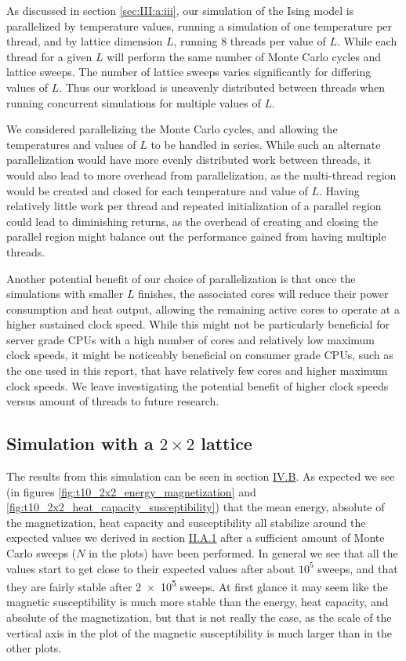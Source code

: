 \documentclass[reprint,english,notitlepage]{revtex4-1}  %
\begin{document}
As discussed in section \ref{sec:III:a:iii}, our simulation of the Ising model is parallelized by temperature values, running a simulation of one temperature per thread, and by lattice dimension \(L\), running \(8\) threads per value of \(L\). While each thread for a given \(L\) will perform the same number of Monte Carlo cycles and lattice sweeps. The number of lattice sweeps varies significantly for differing values of \(L\). Thus our workload is uneavenly distributed between threads when running concurrent simulations for multiple values of \(L\).

We considered parallelizing the Monte Carlo cycles, and allowing the temperatures and values of \(L\) to be handled in series. While such an alternate parallelization would have more evenly distributed work between threads, it would also lead to more overhead from parallelization, as the multi-thread region would be created and closed for each temperature and value of \(L\). Having relatively little work per thread and repeated initialization of a parallel region could lead to diminishing returns, as the overhead of creating and closing the parallel region might balance out the performance gained from having multiple threads.

Another potential benefit of our choice of parallelization is that once the simulations with smaller \(L\) finishes, the associated cores will reduce their power consumption and heat output, allowing the remaining active cores to operate at a higher sustained clock speed. While this might not be particularly beneficial for server grade CPUs with a high number of cores and relatively low maximum clock speeds, it might be noticeably beneficial on consumer grade CPUs, such as the one used in this report, that have relatively few cores and higher maximum clock speeds. We leave investigating the potential benefit of higher clock speeds versus amount of threads to future research.

\subsection{Simulation with a $2\times 2$ lattice} \label{sec:V:B}

The results from this simulation can be seen in section \hyperref[sec:IV:B]{IV.B}. As expected we see (in figures \ref{fig:t10_2x2_energy_magnetization} and \ref{fig:t10_2x2_heat_capacity_susceptibility}) that the mean energy, absolute of the magnetization, heat capacity and susceptibility all stabilize around the expected values we derived in section \hyperref[sec:II:A:i]{II.A.1} after a sufficient amount of Monte Carlo sweeps ($N$ in the plots) have been performed. In general we see that all the values start to get close to their expected values after about $10^5$ sweeps, and that they are fairly stable after \num{2e5} sweeps. At first glance it may seem like the magnetic susceptibility is much more stable than the energy, heat capacity, and absolute of the magnetization, but that is not really the case, as the scale of the vertical axis in the plot of the magnetic susceptibility is much larger than in the other plots.
\end{document}
